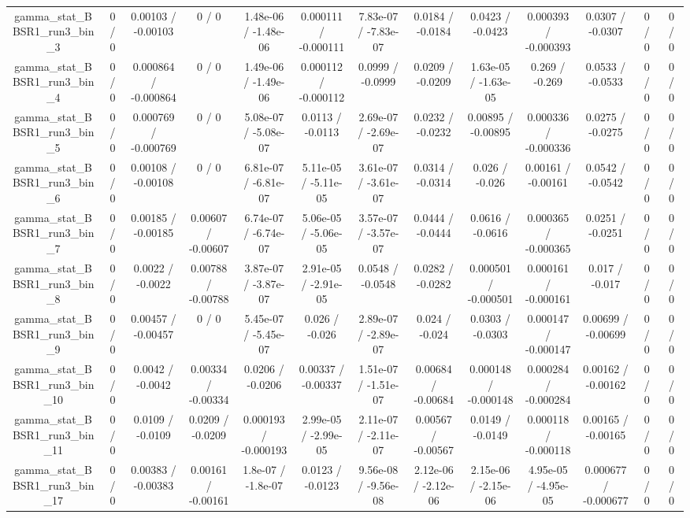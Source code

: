 \documentclass[10pt]{article}
\begin{document}
\begin{table}[htbp]
\begin{center}
\begin{tabular}{|c|c|c|c|c|c|c|c|c|c|c|c|c|}
  gamma_stat_BBSR1_run3_bin_3 & 0 / 0 & 0.00103 / -0.00103 & 0 / 0 & 1.48e-06 / -1.48e-06 & 0.000111 / -0.000111 & 7.83e-07 / -7.83e-07 & 0.0184 / -0.0184 & 0.0423 / -0.0423 & 0.000393 / -0.000393 & 0.0307 / -0.0307 & 0 / 0 & 0 / 0 \\ 
  gamma_stat_BBSR1_run3_bin_4 & 0 / 0 & 0.000864 / -0.000864 & 0 / 0 & 1.49e-06 / -1.49e-06 & 0.000112 / -0.000112 & 0.0999 / -0.0999 & 0.0209 / -0.0209 & 1.63e-05 / -1.63e-05 & 0.269 / -0.269 & 0.0533 / -0.0533 & 0 / 0 & 0 / 0 \\ 
  gamma_stat_BBSR1_run3_bin_5 & 0 / 0 & 0.000769 / -0.000769 & 0 / 0 & 5.08e-07 / -5.08e-07 & 0.0113 / -0.0113 & 2.69e-07 / -2.69e-07 & 0.0232 / -0.0232 & 0.00895 / -0.00895 & 0.000336 / -0.000336 & 0.0275 / -0.0275 & 0 / 0 & 0 / 0 \\ 
  gamma_stat_BBSR1_run3_bin_6 & 0 / 0 & 0.00108 / -0.00108 & 0 / 0 & 6.81e-07 / -6.81e-07 & 5.11e-05 / -5.11e-05 & 3.61e-07 / -3.61e-07 & 0.0314 / -0.0314 & 0.026 / -0.026 & 0.00161 / -0.00161 & 0.0542 / -0.0542 & 0 / 0 & 0 / 0 \\ 
  gamma_stat_BBSR1_run3_bin_7 & 0 / 0 & 0.00185 / -0.00185 & 0.00607 / -0.00607 & 6.74e-07 / -6.74e-07 & 5.06e-05 / -5.06e-05 & 3.57e-07 / -3.57e-07 & 0.0444 / -0.0444 & 0.0616 / -0.0616 & 0.000365 / -0.000365 & 0.0251 / -0.0251 & 0 / 0 & 0 / 0 \\ 
  gamma_stat_BBSR1_run3_bin_8 & 0 / 0 & 0.0022 / -0.0022 & 0.00788 / -0.00788 & 3.87e-07 / -3.87e-07 & 2.91e-05 / -2.91e-05 & 0.0548 / -0.0548 & 0.0282 / -0.0282 & 0.000501 / -0.000501 & 0.000161 / -0.000161 & 0.017 / -0.017 & 0 / 0 & 0 / 0 \\ 
  gamma_stat_BBSR1_run3_bin_9 & 0 / 0 & 0.00457 / -0.00457 & 0 / 0 & 5.45e-07 / -5.45e-07 & 0.026 / -0.026 & 2.89e-07 / -2.89e-07 & 0.024 / -0.024 & 0.0303 / -0.0303 & 0.000147 / -0.000147 & 0.00699 / -0.00699 & 0 / 0 & 0 / 0 \\ 
  gamma_stat_BBSR1_run3_bin_10 & 0 / 0 & 0.0042 / -0.0042 & 0.00334 / -0.00334 & 0.0206 / -0.0206 & 0.00337 / -0.00337 & 1.51e-07 / -1.51e-07 & 0.00684 / -0.00684 & 0.000148 / -0.000148 & 0.000284 / -0.000284 & 0.00162 / -0.00162 & 0 / 0 & 0 / 0 \\ 
  gamma_stat_BBSR1_run3_bin_11 & 0 / 0 & 0.0109 / -0.0109 & 0.0209 / -0.0209 & 0.000193 / -0.000193 & 2.99e-05 / -2.99e-05 & 2.11e-07 / -2.11e-07 & 0.00567 / -0.00567 & 0.0149 / -0.0149 & 0.000118 / -0.000118 & 0.00165 / -0.00165 & 0 / 0 & 0 / 0 \\ 
  gamma_stat_BBSR1_run3_bin_17 & 0 / 0 & 0.00383 / -0.00383 & 0.00161 / -0.00161 & 1.8e-07 / -1.8e-07 & 0.0123 / -0.0123 & 9.56e-08 / -9.56e-08 & 2.12e-06 / -2.12e-06 & 2.15e-06 / -2.15e-06 & 4.95e-05 / -4.95e-05 & 0.000677 / -0.000677 & 0 / 0 & 0 / 0 \\ 

\end{tabular}
\end{center}
\end{table}
\end{document}
